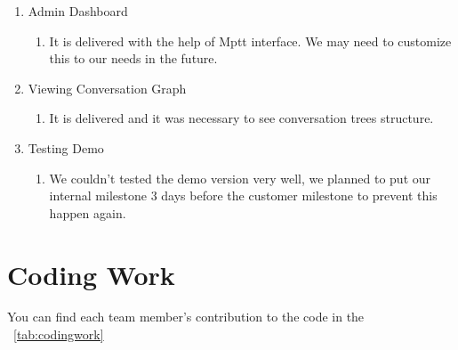 \documentclass[a4paper]{article}
\begin{document}
\begin{enumerate}
  \item Admin Dashboard
  \begin{enumerate}
 \item  It is delivered with the help of Mptt interface. We may need to customize this to our needs in the future. 
    \end{enumerate}
    \item Viewing Conversation Graph
    \begin{enumerate}
  \item It is delivered and it was necessary to see conversation trees structure.
      \end{enumerate}
      \item Testing Demo
      \begin{enumerate}
    \item  We couldn't tested the demo version very well, we planned to put our internal milestone 3 days before the customer milestone to prevent this happen again.
      \end{enumerate}
      \end{enumerate}
\newpage
\section{Coding Work}
You can find each team member's contribution to the code in the ~\autoref{tab:codingwork}
\end{document}
